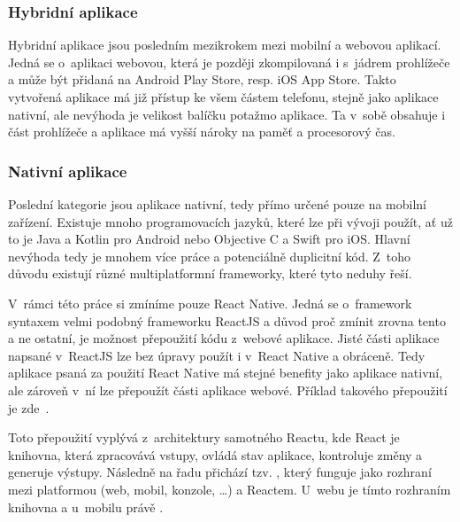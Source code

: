 \subsubsection*{Hybridní aplikace}
Hybridní aplikace jsou posledním mezikrokem mezi mobilní a webovou aplikací. Jedná se o~aplikaci webovou, která je později zkompilovaná i s~jádrem prohlížeče a může být přidaná na Android Play Store, resp. iOS App Store. Takto vytvořená aplikace má již přístup ke všem částem telefonu, stejně jako aplikace nativní, ale nevýhoda je velikost balíčku potažmo aplikace. Ta v~sobě obsahuje i část prohlížeče a aplikace má vyšší nároky na paměť a procesorový čas.

\subsubsection*{Nativní aplikace}
Poslední kategorie jsou aplikace nativní, tedy přímo určené pouze na mobilní zařízení. Existuje mnoho programovacích jazyků, které lze při vývoji použít, ať už to je Java a Kotlin pro Android nebo Objective C a Swift pro iOS. Hlavní nevýhoda tedy je mnohem více práce a potenciálně duplicitní kód. Z~toho důvodu existují různé multiplatformní frameworky, které tyto neduhy řeší.

V~rámci této práce si zmíníme pouze React Native. Jedná se o~framework syntaxem velmi podobný frameworku ReactJS a důvod proč zmínit zrovna tento a ne ostatní, je možnost přepoužití kódu z~webové aplikace. Jisté části aplikace napsané v~ReactJS lze bez úpravy použít i v~React Native a obráceně. Tedy aplikace psaná za použití React Native má stejné benefity jako aplikace nativní, ale zároveň v~ní lze přepoužít části aplikace webové. Příklad takového přepoužití je zde~\cite{sepulveda_2017_share}.

Toto přepoužití vyplývá z~architektury samotného Reactu, kde React je knihovna, která zpracovává vstupy, ovládá stav aplikace, kontroluje změny a generuje výstupy. Následně na řadu přichází tzv. , který funguje jako rozhraní mezi platformou (web, mobil, konzole, \ldots{}) a Reactem. U~webu je tímto rozhraním knihovna  a u~mobilu právě .

